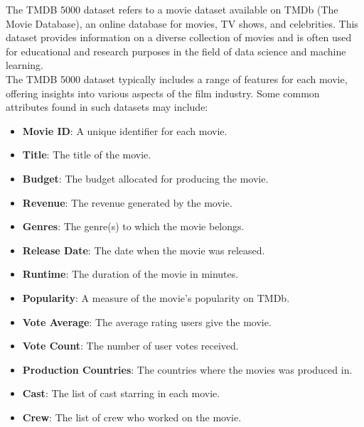 \documentclass[conference]{IEEEtran}
\begin{document}
The TMDB 5000 dataset refers to a movie dataset available on TMDb (The Movie Database), an online database for movies, TV shows, and celebrities. This dataset provides information on a diverse collection of movies and is often used for educational and research purposes in the field of data science and machine learning.\\
The TMDB 5000 dataset typically includes a range of features for each movie, offering insights into various aspects of the film industry. Some common attributes found in such datasets may include:
\begin{itemize}
    \item \textbf{Movie ID}: A unique identifier for each movie.
    \item \textbf{Title}: The title of the movie.
    \item \textbf{Budget}: The budget allocated for producing the movie.
    \item \textbf{Revenue}: The revenue generated by the movie. 
    \item \textbf{Genres}: The genre(s) to which the movie belongs.
    \item \textbf{Release Date}: The date when the movie was released.
    \item \textbf{Runtime}: The duration of the movie in minutes.
    \item \textbf{Popularity}: A measure of the movie's popularity on TMDb.
    \item \textbf{Vote Average}: The average rating users give the movie.
    \item \textbf{Vote Count}: The number of user votes received.
    \item \textbf{Production Countries}: The countries where the movies was produced in.
    \item \textbf{Cast}: The list of cast starring in each movie.
    \item \textbf{Crew}: The list of crew who worked on the movie.
\end{itemize}
\end{document}
